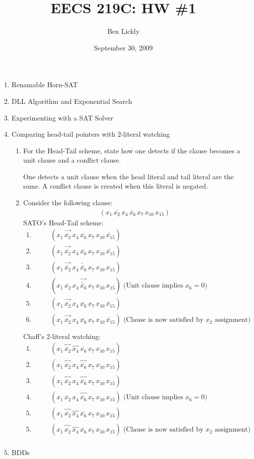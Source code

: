\documentclass{amsart}
\title{EECS 219C: HW \#1}
\author{Ben Lickly}
\date{September 30, 2009}
\begin{document}
\newcommand{\no}[1]{\overline{#1}}
\newcommand{\lef}[1]{\overrightarrow{#1}}
\newcommand{\ri}[1]{\overleftarrow{#1}}
\newcommand{\po}[1]{\overbrace{#1}}
\begin{enumerate}
  \item Renamable Horn-SAT
  \item DLL Algorithm and Exponential Search
  \item Experimenting with a SAT Solver
  \item Comparing head-tail pointers with 2-literal watching
    \begin{enumerate}
      \item For the Head-Tail scheme, state how one detects if the clause becomes a unit clause and a conflict clause.

        One detects a unit clause when the head literal and tail literal are
        the same. A conflict clause is created when this literal is negated.
      \item Consider the following clause:
        \begin{align*}
          (x_1 \, \no{x_2} \, x_4 \, \no{x_6} \, x_7 \, x_{10} \, x_{15})
        \end{align*}
SATO's Head-Tail scheme:
\begin{align*}
1.\qquad&(x_1\, \lef{\no{x_2}}\, x_4\, \no{x_6}\, x_7\, x_{10}\, \ri{x_{15}})\\
2.\qquad&(x_1\, \lef{\no{x_2}}\, x_4\, \no{x_6}\, x_7\, x_{10}\, \ri{x_{15}})\\
3.\qquad&(x_1\, \lef{\no{x_2}}\, x_4\, \ri{\no{x_6}}\, x_7\, x_{10}\, x_{15})\\
4.\qquad&(x_1\, \no{x_2}\, x_4\, \lef{\ri{\no{x_6}}}\, x_7\, x_{10}\, x_{15})
\text{ (Unit clause implies $x_6 = 0$)} \\
5.\qquad&(x_1\, \lef{\no{x_2}}\, x_4\, \no{x_6}\, x_7\, x_{10}\, \ri{x_{15}})\\
6.\qquad&(x_1\, \lef{\no{x_2}}\, x_4\, \no{x_6}\, x_7\, x_{10}\, \ri{x_{15}})
\text{ (Clause is now satisfied by $x_2$ assignment)} \\
\end{align*}
Chaff’s 2-literal watching:
\begin{align*}
1.\qquad&(x_1\, \po{\no{x_2}}\, \po{x_4}\, \no{x_6}\, x_7\, x_{10}\, x_{15})\\
2.\qquad&(x_1\, \po{\no{x_2}}\, x_4\, \po{\no{x_6}}\, x_7\, x_{10}\, x_{15})\\
3.\qquad&(x_1\, \po{\no{x_2}}\, x_4\, \po{\no{x_6}}\, x_7\, x_{10}\, x_{15})\\
4.\qquad&(x_1\, \no{x_2}\, x_4\, \po{\no{x_6}}\, x_7\, x_{10}\, x_{15})
\text{ (Unit clause implies $x_6 = 0$)} \\
5.\qquad&(x_1\, \po{\no{x_2}}\, \po{x_4}\, \no{x_6}\, x_7\, x_{10}\, x_{15})\\
5.\qquad&(x_1\, \po{\no{x_2}}\, \po{x_4}\, \no{x_6}\, x_7\, x_{10}\, x_{15})
\text{ (Clause is now satisfied by $x_2$ assignment)} \\
\end{align*}
    \end{enumerate}
  \item BDDs


\end{enumerate}
\end{document}
